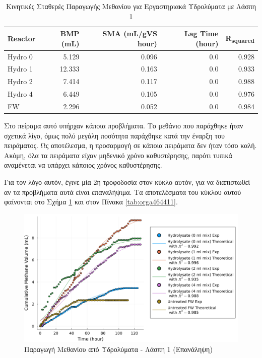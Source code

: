\documentclass[11pt]{report}
\begin{document}
\begin{enumerate}
\begin{table}[htbp]
\caption{\label{tab:orgba09807}Κινητικές Σταθερές Παραγωγής Μεθανίου για Εργαστηριακά Υδρολύματα με Λάσπη 1}
\centering
\begin{tabular}{lrrrr}
Reactor & BMP (mL) & SMA (mL/gVS hour) & Lag Time (hour) & R\textsubscript{squared}\\[0pt]
\hline
Hydro 0 & 5.129 & 0.096 & 0.0 & 0.928\\[0pt]
Hydro 1 & 12.333 & 0.163 & 0.0 & 0.933\\[0pt]
Hydro 2 & 7.414 & 0.117 & 0.0 & 0.988\\[0pt]
Hydro 4 & 6.449 & 0.105 & 0.0 & 0.976\\[0pt]
FW & 2.296 & 0.052 & 0.0 & 0.984\\[0pt]
\end{tabular}
\end{table}

Στο πείραμα αυτό υπήρχαν κάποια προβλήματα. Το μεθάνιο που παράχθηκε ήταν σχετικά λίγο, όμως πολύ μεγάλη ποσότητα παράχθηκε κατά την έναρξη του πειράματος. Ως αποτέλεσμα, η προσαρμογή σε κάποια πειράματα δεν ήταν τόσο καλή. Ακόμη, όλα τα πειράματα είχαν μηδενικό χρόνο καθυστέρησης, παρότι τυπικά αναμένεται να υπάρχει κάποιος χρόνος καθυστέρησης.

Για τον λόγο αυτόν, έγινε μία 2η τροφοδοσία στον κύκλο αυτόν, για να διαπιστωθεί αν τα προβλήματα αυτά είναι επαναλήψιμα. Τα αποτελέσματα του κύκλου αυτού φαίνονται στο Σχήμα \ref{fig:org2fb71dc} και στον Πίνακα \ref{tab:orga464411}.

\begin{figure}[htbp]
\centering
\includegraphics[width=.9\linewidth]{../plots/BMPs/methane_s1_r2_comp.png}
\caption{\label{fig:org2fb71dc}Παραγωγή Μεθανίου από Υδρολύματα - Λάσπη 1 (Επανάληψη)}
\end{figure}


\end{enumerate}
\end{document}
